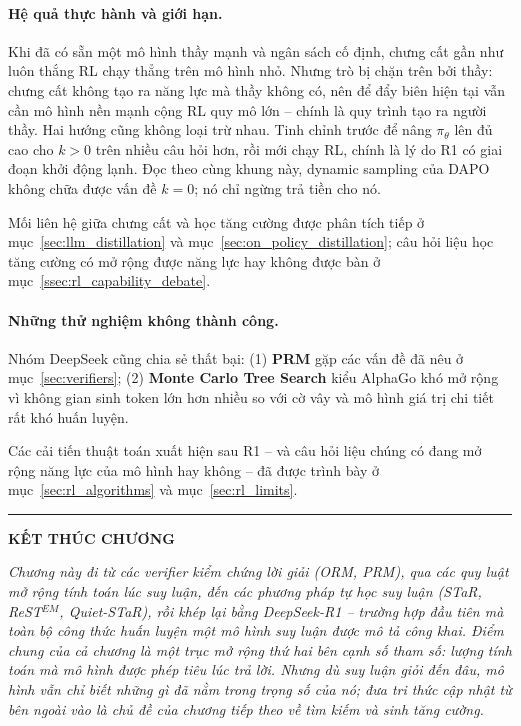\paragraph{Hệ quả thực hành và giới hạn.}
Khi đã có sẵn một mô hình thầy mạnh và ngân sách cố định, chưng cất gần như luôn thắng RL chạy thẳng trên mô hình nhỏ. Nhưng trò bị chặn trên bởi thầy: chưng cất không tạo ra năng lực mà thầy không có, nên để đẩy biên hiện tại vẫn cần mô hình nền mạnh cộng RL quy mô lớn -- chính là quy trình tạo ra người thầy. Hai hướng cũng không loại trừ nhau. Tinh chỉnh trước để nâng $\pi_\theta$ lên đủ cao cho $k > 0$ trên nhiều câu hỏi hơn, rồi mới chạy RL, chính là lý do R1 có giai đoạn khởi động lạnh. Đọc theo cùng khung này, dynamic sampling của DAPO không chữa được vấn đề $k = 0$; nó chỉ ngừng trả tiền cho nó.

Mối liên hệ giữa chưng cất và học tăng cường được phân tích tiếp ở mục~\ref{sec:llm_distillation} và mục~\ref{sec:on_policy_distillation}; câu hỏi liệu học tăng cường có mở rộng được năng lực hay không được bàn ở mục~\ref{ssec:rl_capability_debate}.

\paragraph{Những thử nghiệm không thành công.} Nhóm DeepSeek cũng chia sẻ thất bại: (1) \textbf{PRM} gặp các vấn đề đã nêu ở mục~\ref{sec:verifiers}; (2) \textbf{Monte Carlo Tree Search} kiểu AlphaGo khó mở rộng vì không gian sinh token lớn hơn nhiều so với cờ vây và mô hình giá trị chi tiết rất khó huấn luyện.

Các cải tiến thuật toán xuất hiện sau R1 -- và câu hỏi liệu chúng có đang mở rộng năng lực của mô hình hay không -- đã được trình bày ở mục~\ref{sec:rl_algorithms} và mục~\ref{sec:rl_limits}.

\bigskip
\hrule
\bigskip

\begin{center}
	\textbf{\Large KẾT THÚC CHƯƠNG \thechapter}
\end{center}

\textit{Chương này đi từ các verifier kiểm chứng lời giải (ORM, PRM), qua các quy luật mở rộng tính toán lúc suy luận, đến các phương pháp tự học suy luận (STaR, ReST$^{EM}$, Quiet-STaR), rồi khép lại bằng DeepSeek-R1 -- trường hợp đầu tiên mà toàn bộ công thức huấn luyện một mô hình suy luận được mô tả công khai. Điểm chung của cả chương là một trục mở rộng thứ hai bên cạnh số tham số: lượng tính toán mà mô hình được phép tiêu lúc trả lời. Nhưng dù suy luận giỏi đến đâu, mô hình vẫn chỉ biết những gì đã nằm trong trọng số của nó; đưa tri thức cập nhật từ bên ngoài vào là chủ đề của chương tiếp theo về tìm kiếm và sinh tăng cường.}
